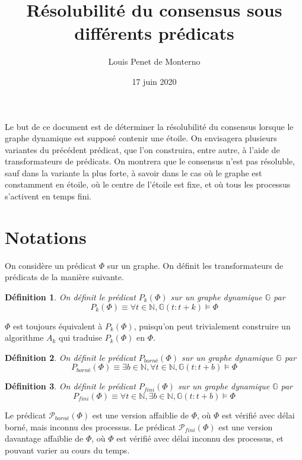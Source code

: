 \documentclass{article}
\title{Résolubilité du consensus sous différents prédicats}
\date{17 juin 2020}
\author{Louis Penet de Monterno}
\newtheorem{definition}{Définition}
\begin{document}
\maketitle

Le but de ce document est de déterminer la résolubilité du consensus lorsque le graphe dynamique est supposé contenir une étoile.
On envisagera plusieurs variantes du précédent prédicat, que l'on construira, entre autre, à l'aide de transformateurs de prédicats.
On montrera que le consensus n'est pas résoluble, sauf dans la variante la plus forte, à savoir dans le cas où le graphe est constamment en étoile,
où le centre de l'étoile est fixe, et où tous les processus s'activent en temps fini.

\section{Notations}

On considère un prédicat $\Phi$ sur un graphe. On définit les transformateurs de prédicats de la manière suivante.

\begin{definition}
	On définit le prédicat $P_k(\Phi)$ sur un graphe dynamique
	$\mathds{G}$ par $$P_k(\Phi) \equiv \forall t \in \mathds{N}, \mathds{G}(t:t+k) \models \Phi$$
\end{definition}

$\Phi$ est toujours équivalent à $P_k(\Phi)$, puisqu'on peut trivialement construire un algorithme $A_k$ qui traduise $P_k(\Phi)$ en $\Phi$.

\begin{definition}
	On définit le prédicat $P_{borné}(\Phi)$ sur un graphe dynamique
	$\mathds{G}$ par $$P_{borné}(\Phi) \equiv \exists b \in \mathds{N}, \forall t \in \mathds{N}, \mathds{G}(t:t+b) \models \Phi$$
\end{definition}
\begin{definition}
	On définit le prédicat $P_{fini}(\Phi)$ sur un graphe dynamique
	$\mathds{G}$ par $$P_{fini}(\Phi) \equiv  \forall t \in \mathds{N}, \exists b \in \mathds{N}, \mathds{G}(t:t+b) \models \Phi$$
\end{definition}

Le prédicat $\mathcal{P}_{borné}(\Phi)$ est une version affaiblie de $\Phi$, où $\Phi$ est vérifié avec délai borné, mais inconnu des processus.
Le prédicat $\mathcal{P}_{fini}(\Phi)$ est une version davantage affaiblie de $\Phi$, où $\Phi$ est vérifié avec délai inconnu des processus, et pouvant varier au cours du temps.
\end{document}
